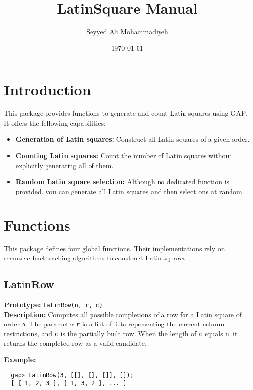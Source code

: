 \documentclass{report}
\title{LatinSquare Manual}
\author{Seyyed Ali Mohammadiyeh}
\date{\today}
\begin{document}
\maketitle
\tableofcontents
\clearpage

\chapter{Introduction}
This package provides functions to generate and count Latin squares using GAP. It offers the following capabilities:
\begin{itemize}
  \item \textbf{Generation of Latin squares:} Construct all Latin squares of a given order.
  \item \textbf{Counting Latin squares:} Count the number of Latin squares without explicitly generating all of them.
  \item \textbf{Random Latin square selection:} Although no dedicated function is provided, you can generate all Latin squares and then select one at random.
\end{itemize}

\chapter{Functions}
This package defines four global functions. Their implementations rely on recursive backtracking algorithms to construct Latin squares.

\section{LatinRow}
\textbf{Prototype:} \texttt{LatinRow(n, r, c)}\\[1mm]
\textbf{Description:}  
Computes all possible completions of a row for a Latin square of order \texttt{n}. The parameter \texttt{r} is a list of lists representing the current column restrictions, and \texttt{c} is the partially built row. When the length of \texttt{c} equals \texttt{n}, it returns the completed row as a valid candidate. 

\textbf{Example:}
\begin{verbatim}
  gap> LatinRow(3, [[], [], []], []);
  [ [ 1, 2, 3 ], [ 1, 3, 2 ], ... ]
\end{verbatim}
\end{document}
